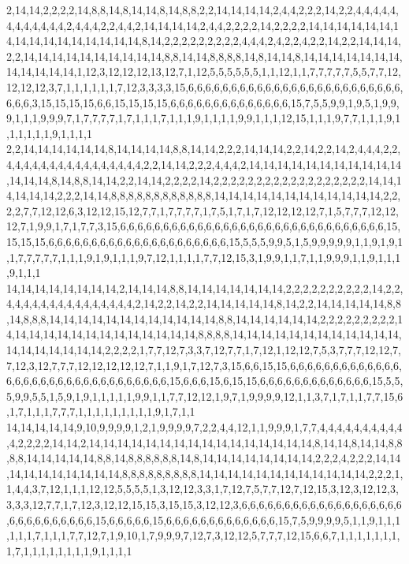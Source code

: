 2,14,14,2,2,2,2,14,8,8,14,8,14,14,8,14,8,8,2,2,14,14,14,14,2,4,4,2,2,2,14,2,2,4,4,4,4,4,4,4,4,4,4,4,4,2,4,4,4,2,2,4,4,2,14,14,14,14,2,4,4,2,2,2,2,14,2,2,2,2,14,14,14,14,14,14,14,14,14,14,14,14,14,14,14,14,8,14,2,2,2,2,2,2,2,2,2,4,4,4,2,4,2,2,4,2,2,14,2,2,14,14,14,2,2,14,14,14,14,14,14,14,14,14,14,8,8,14,14,8,8,8,8,14,8,14,14,8,14,14,14,14,14,14,14,14,14,14,14,14,1,12,3,12,12,12,13,12,7,1,12,5,5,5,5,5,5,1,1,12,1,1,7,7,7,7,7,5,5,7,7,12,12,12,12,3,7,1,1,1,1,1,1,7,12,3,3,3,3,15,6,6,6,6,6,6,6,6,6,6,6,6,6,6,6,6,6,6,6,6,6,6,6,6,6,6,6,6,3,15,15,15,15,6,6,15,15,15,15,6,6,6,6,6,6,6,6,6,6,6,6,6,6,15,7,5,5,9,9,1,9,5,1,9,9,9,1,1,1,9,9,9,7,1,7,7,7,7,1,7,1,1,1,7,1,1,1,9,1,1,1,1,9,9,1,1,1,12,15,1,1,1,9,7,7,1,1,1,9,1,1,1,1,1,1,9,1,1,1,1
2,2,14,14,14,14,14,14,8,14,14,14,14,8,8,14,14,2,2,2,14,14,14,2,2,14,2,2,14,2,4,4,4,2,2,4,4,4,4,4,4,4,4,4,4,4,4,4,4,4,4,2,2,14,14,2,2,2,4,4,4,2,14,14,14,14,14,14,14,14,14,14,14,14,14,14,8,14,8,8,14,14,2,2,14,14,2,2,2,2,14,2,2,2,2,2,2,2,2,2,2,2,2,2,2,2,2,2,2,14,14,14,14,14,14,2,2,2,14,14,8,8,8,8,8,8,8,8,8,8,8,8,14,14,14,14,14,14,14,14,14,14,14,14,2,2,2,2,7,7,12,12,6,3,12,12,15,12,7,7,1,7,7,7,7,1,7,5,1,7,1,7,12,12,12,12,7,1,5,7,7,7,12,12,12,7,1,9,9,1,7,1,7,7,3,15,6,6,6,6,6,6,6,6,6,6,6,6,6,6,6,6,6,6,6,6,6,6,6,6,6,6,6,6,6,6,6,15,15,15,15,6,6,6,6,6,6,6,6,6,6,6,6,6,6,6,6,6,6,6,6,6,15,5,5,5,9,9,5,1,5,9,9,9,9,9,1,1,9,1,9,1,1,7,7,7,7,7,1,1,1,9,1,9,1,1,1,9,7,12,1,1,1,1,7,7,12,15,3,1,9,9,1,1,7,1,1,9,9,9,1,1,9,1,1,1,9,1,1,1
14,14,14,14,14,14,14,14,2,14,14,14,8,8,14,14,14,14,14,14,14,2,2,2,2,2,2,2,2,2,2,14,2,2,4,4,4,4,4,4,4,4,4,4,4,4,4,4,4,2,14,2,2,14,2,2,14,14,14,14,14,8,14,2,2,14,14,14,14,14,8,8,14,8,8,8,14,14,14,14,14,14,14,14,14,14,14,14,8,8,14,14,14,14,14,14,2,2,2,2,2,2,2,2,2,14,14,14,14,14,14,14,14,14,14,14,14,14,14,8,8,8,8,14,14,14,14,14,14,14,14,14,14,14,14,14,14,14,14,14,14,14,2,2,2,2,1,7,7,12,7,3,3,7,12,7,7,1,7,12,1,12,12,7,5,3,7,7,7,12,12,7,7,12,3,12,7,7,7,12,12,12,12,12,7,1,1,9,1,7,12,7,3,15,6,6,15,15,6,6,6,6,6,6,6,6,6,6,6,6,6,6,6,6,6,6,6,6,6,6,6,6,6,6,6,6,6,6,6,6,15,6,6,6,15,6,15,15,6,6,6,6,6,6,6,6,6,6,6,6,6,15,5,5,5,9,9,5,5,1,5,9,1,9,1,1,1,1,1,9,9,1,1,7,7,12,12,1,9,7,1,9,9,9,9,12,1,1,3,7,1,7,1,1,7,7,15,6,1,7,1,1,1,7,7,7,1,1,1,1,1,1,1,1,1,9,1,7,1,1
14,14,14,14,14,9,10,9,9,9,9,1,2,1,9,9,9,9,7,2,2,4,4,12,1,1,9,9,9,1,7,7,4,4,4,4,4,4,4,4,4,4,4,2,2,2,2,14,14,2,14,14,14,14,14,14,14,14,14,14,14,14,14,14,14,14,8,14,14,8,14,14,8,8,8,8,14,14,14,14,14,8,8,14,8,8,8,8,8,8,14,8,14,14,14,14,14,14,14,14,2,2,2,4,2,2,2,14,14,14,14,14,14,14,14,14,14,8,8,8,8,8,8,8,8,8,14,14,14,14,14,14,14,14,14,14,14,14,2,2,2,1,1,4,4,3,7,12,1,1,1,12,12,5,5,5,5,1,3,12,12,3,3,1,7,12,7,5,7,7,12,7,12,15,3,12,3,12,12,3,3,3,3,12,7,7,1,7,12,3,12,12,15,15,3,15,15,3,12,12,3,6,6,6,6,6,6,6,6,6,6,6,6,6,6,6,6,6,6,6,6,6,6,6,6,6,6,6,6,6,15,6,6,6,6,6,15,6,6,6,6,6,6,6,6,6,6,6,6,6,15,7,5,9,9,9,9,5,1,1,9,1,1,1,1,1,1,7,1,1,1,7,7,12,7,1,9,10,1,7,9,9,9,7,12,7,3,12,12,5,7,7,7,12,15,6,6,7,1,1,1,1,1,1,1,1,7,1,1,1,1,1,1,1,1,9,1,1,1,1

